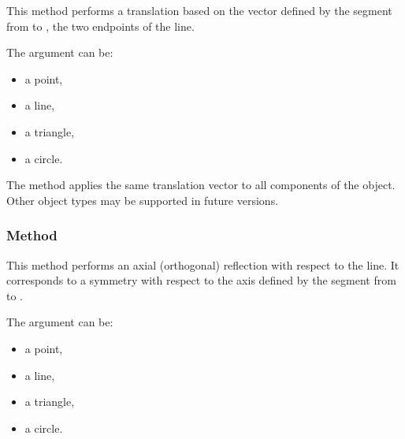 This method performs a translation based on the vector defined by the segment from  to , the two endpoints of the line.

\medskip
\noindent
The argument  can be:
\begin{itemize}
  \item a point,
  \item a line,
  \item a triangle,
  \item a circle.
\end{itemize}

\noindent
The method applies the same translation vector to all components of the object. Other object types may be supported in future versions.

\vspace{1em}

\begin{tkzexample}[latex=.5\textwidth]
\begin{center}
\end{center}
\end{tkzexample}


\subsubsection{Method } %
\label{ssub:reflection_of_object}

This method performs an axial (orthogonal) reflection with respect to the line. It corresponds to a symmetry with respect to the axis defined by the segment from  to .

\medskip
\noindent
The argument  can be:
\begin{itemize}
  \item a point,
  \item a line,
  \item a triangle,
  \item a circle.
\end{itemize}

